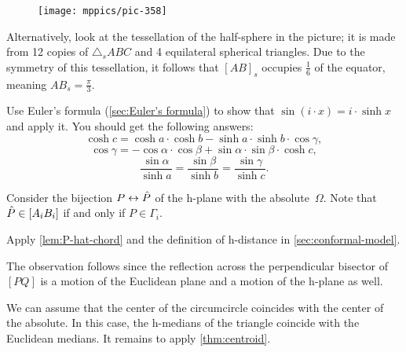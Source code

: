 {

\begin{wrapfigure}{r}{28mm}
\vskip-0mm
\centering
\texttt{[image: mppics/pic-358]}
\end{wrapfigure}

Alternatively, 
look at the tessellation of the half-sphere in the picture;
it is made from 12 copies of $\triangle_s A B C$ and 4 equilateral spherical triangles.
Due to the symmetry of this tessellation, it follows that $[AB]_s$ occupies $\tfrac16$ of the equator, meaning $AB_s=\tfrac\pi3$.

}

Use Euler's formula (\ref{sec:Euler's formula}) to show that $\sin(i\cdot x)=i\cdot\sinh x$ and apply it.
You should get the following answers:
\[\cosh c=\cosh a \cdot \cosh b-\sinh a\cdot \sinh b\cdot \cos\gamma,\]
\[\cos \gamma=-\cos \alpha \cdot \cos \beta+\sin \alpha\cdot \sin \beta \cdot \cosh c,\]
\[\frac{\sin \alpha}{\sinh a}=\frac{\sin \beta}{\sinh b}=\frac{\sin \gamma}{\sinh c}.\]




\setcounter{eqtn}{0}



Consider the bijection $P\leftrightarrow \hat P$ of the h-plane with the absolute~$\Omega$.
Note that $\hat P\in [A_iB_i]$ if and only if $P\in\Gamma_i$.

 Apply \ref{lem:P-hat-chord} and the definition of h-distance in \ref{sec:conformal-model}.

The observation follows since the reflection across the perpendicular bisector of $[PQ]$ is a motion of the Euclidean plane and a motion of the h-plane as well.

We can assume that the center of the circumcircle coincides with the center of the absolute.
In this case, the h-medians of the triangle coincide with the Euclidean medians.
It remains to apply \ref{thm:centroid}.

